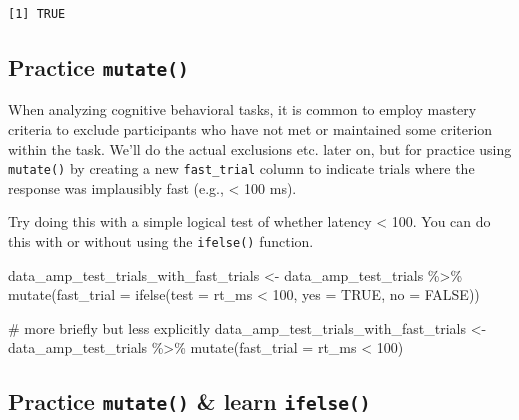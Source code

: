 \documentclass[
  letterpaper,
  DIV=11,
  numbers=noendperiod]{scrreprt}
\newenvironment{Shaded}{\begin{snugshade}}{\end{snugshade}}
\newcommand{\AttributeTok}[1]{\textcolor[rgb]{0.40,0.45,0.13}{#1}}
\newcommand{\CommentTok}[1]{\textcolor[rgb]{0.37,0.37,0.37}{#1}}
\newcommand{\ConstantTok}[1]{\textcolor[rgb]{0.56,0.35,0.01}{#1}}
\newcommand{\DecValTok}[1]{\textcolor[rgb]{0.68,0.00,0.00}{#1}}
\newcommand{\FunctionTok}[1]{\textcolor[rgb]{0.28,0.35,0.67}{#1}}
\newcommand{\NormalTok}[1]{\textcolor[rgb]{0.00,0.23,0.31}{#1}}
\newcommand{\OtherTok}[1]{\textcolor[rgb]{0.00,0.23,0.31}{#1}}
\newcommand{\SpecialCharTok}[1]{\textcolor[rgb]{0.37,0.37,0.37}{#1}}
\begin{document}
\begin{verbatim}
[1] TRUE
\end{verbatim}

\subsection{\texorpdfstring{Practice
\texttt{mutate()}}{Practice mutate()}}\label{practice-mutate}

When analyzing cognitive behavioral tasks, it is common to employ
mastery criteria to exclude participants who have not met or maintained
some criterion within the task. We'll do the actual exclusions etc.
later on, but for practice using \texttt{mutate()} by creating a new
\texttt{fast\_trial} column to indicate trials where the response was
implausibly fast (e.g., \textless{} 100 ms).

Try doing this with a simple logical test of whether latency \textless{}
100. You can do this with or without using the \texttt{ifelse()}
function.

\begin{Shaded}
\begin{Highlighting}[]
\NormalTok{data\_amp\_test\_trials\_with\_fast\_trials }\OtherTok{\textless{}{-}}\NormalTok{ data\_amp\_test\_trials }\SpecialCharTok{\%\textgreater{}\%}
  \FunctionTok{mutate}\NormalTok{(}\AttributeTok{fast\_trial =} \FunctionTok{ifelse}\NormalTok{(}\AttributeTok{test =}\NormalTok{ rt\_ms }\SpecialCharTok{\textless{}} \DecValTok{100}\NormalTok{,}
                             \AttributeTok{yes =} \ConstantTok{TRUE}\NormalTok{,}
                             \AttributeTok{no =} \ConstantTok{FALSE}\NormalTok{))}

\CommentTok{\# more briefly but less explicitly}
\NormalTok{data\_amp\_test\_trials\_with\_fast\_trials }\OtherTok{\textless{}{-}}\NormalTok{ data\_amp\_test\_trials }\SpecialCharTok{\%\textgreater{}\%}
  \FunctionTok{mutate}\NormalTok{(}\AttributeTok{fast\_trial =}\NormalTok{ rt\_ms }\SpecialCharTok{\textless{}} \DecValTok{100}\NormalTok{)}
\end{Highlighting}
\end{Shaded}

\subsection{\texorpdfstring{Practice \texttt{mutate()} \& learn
\texttt{ifelse()}}{Practice mutate() \& learn ifelse()}}\label{practice-mutate-learn-ifelse}
\end{document}
